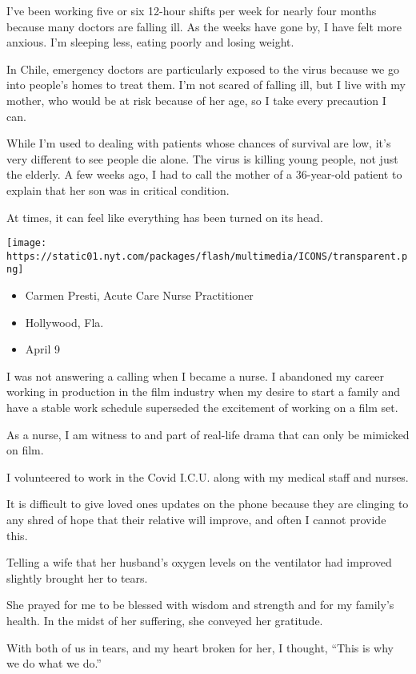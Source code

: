I've been working five or six 12-hour shifts per week for nearly four
months because many doctors are falling ill. As the weeks have gone by,
I have felt more anxious. I'm sleeping less, eating poorly and losing
weight.

In Chile, emergency doctors are particularly exposed to the virus
because we go into people's homes to treat them. I'm not scared of
falling ill, but I live with my mother, who would be at risk because of
her age, so I take every precaution I can.

While I'm used to dealing with patients whose chances of survival are
low, it's very different to see people die alone. The virus is killing
young people, not just the elderly. A few weeks ago, I had to call the
mother of a 36-year-old patient to explain that her son was in critical
condition.

At times, it can feel like everything has been turned on its head.

\texttt{[image: https://static01.nyt.com/packages/flash/multimedia/ICONS/transparent.png]}

\begin{itemize}
\tightlist
\item
  Carmen Presti, Acute Care Nurse Practitioner
\item
  Hollywood, Fla.
\item
  April 9
\end{itemize}

I was not answering a calling when I became a nurse. I abandoned my
career working in production in the film industry when my desire to
start a family and have a stable work schedule superseded the excitement
of working on a film set.

As a nurse, I am witness to and part of real-life drama that can only be
mimicked on film.

I volunteered to work in the Covid I.C.U. along with my medical staff
and nurses.

It is difficult to give loved ones updates on the phone because they are
clinging to any shred of hope that their relative will improve, and
often I cannot provide this.

Telling a wife that her husband's oxygen levels on the ventilator had
improved slightly brought her to tears.

She prayed for me to be blessed with wisdom and strength and for my
family's health. In the midst of her suffering, she conveyed her
gratitude.

With both of us in tears, and my heart broken for her, I thought, ``This
is why we do what we do.''

